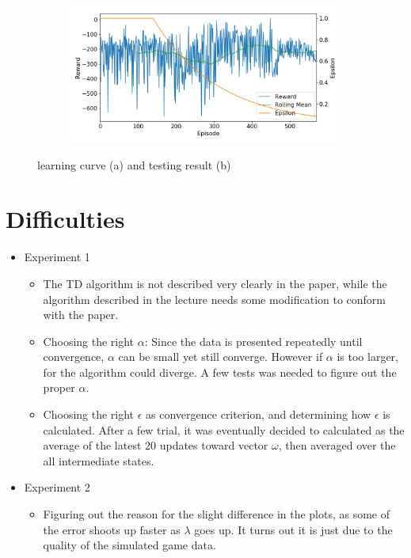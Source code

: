 \documentclass[10pt]{article}
\begin{document}
\begin{figure}[H]
\begin{subfigure}[b]{0.49\linewidth}
      \caption{}
  \label{fig:train_param_0083}
  \end{subfigure}
  \begin{subfigure}[b]{0.49\linewidth}
  \centering
  \includegraphics[width=\linewidth]{../logs/train_param_0084.png}
      \caption{}
  \label{fig:train_param_0084}
  \end{subfigure}
  \caption{learning curve (a) and testing result (b)}
  \label{fig:nnbestparam}
\end{figure}



\section{Difficulties} \label{difficulties}

   	\begin{itemize}
     		\item  Experiment 1
     			\begin{itemize}
					\item The TD algorithm is not described very clearly in the paper, while the algorithm described in the lecture needs some modification to conform with the paper.
       				\item Choosing the right $\alpha$: Since the data is presented repeatedly until convergence, $\alpha$ can be small yet still converge. However if $\alpha$ is too larger, for the algorithm could diverge. A few tests was needed to figure out the proper $\alpha$.
					\item Choosing the right $\epsilon$ as convergence criterion, and determining how $\epsilon$ is calculated. After a few trial, it was eventually decided to calculated as the average of the latest 20 updates toward vector $\omega$, then averaged over the all intermediate states.
    			 \end{itemize}
		     \item  Experiment 2
    			 \begin{itemize}
    				   \item Figuring out the reason for the slight difference in the plots, as some of the error shoots up faster as $\lambda$ goes up. It turns out it is just due to the quality of the simulated game data.
       				   
     			 \end{itemize}
	\end{itemize}
\end{document}
